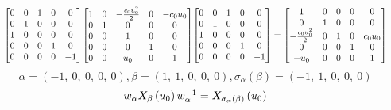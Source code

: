 \documentclass[11pt]{article}
\theoremstyle{definition}
\begin{document}
\[
\scaletoalign{\textwidth}{{\left[\begin{matrix}0 & 0 & 1 & 0 & 0\\0 & 1 & 0 & 0 & 0\\1 & 0 & 0 & 0 & 0\\0 & 0 & 0 & 1 & 0\\0 & 0 & 0 & 0 & -1\end{matrix}\right]} {\left[\begin{matrix}1 & 0 & - \frac{c_{0} u_{0}^{2}}{2} & 0 & - c_{0} u_{0}\\0 & 1 & 0 & 0 & 0\\0 & 0 & 1 & 0 & 0\\0 & 0 & 0 & 1 & 0\\0 & 0 & u_{0} & 0 & 1\end{matrix}\right]} {\left[\begin{matrix}0 & 0 & 1 & 0 & 0\\0 & 1 & 0 & 0 & 0\\1 & 0 & 0 & 0 & 0\\0 & 0 & 0 & 1 & 0\\0 & 0 & 0 & 0 & -1\end{matrix}\right]} = {\left[\begin{matrix}1 & 0 & 0 & 0 & 0\\0 & 1 & 0 & 0 & 0\\- \frac{c_{0} u_{0}^{2}}{2} & 0 & 1 & 0 & c_{0} u_{0}\\0 & 0 & 0 & 1 & 0\\- u_{0} & 0 & 0 & 0 & 1\end{matrix}\right]}}
\]
\[
\alpha = \left( -1, \  0, \  0, \  0, \  0\right), \beta = \left( 1, \  1, \  0, \  0, \  0\right), \sigma_{\alpha}(\beta) = \left( -1, \  1, \  0, \  0, \  0\right)
\]
\[
\scaletoalign{\textwidth}{w_{\alpha} X_{\beta}\left(u_{0}\right) w_{\alpha}^{-1} = X_{\sigma_{\alpha}\left(\beta\right)}\left(u_{0}\right)}
\]
\end{document}

